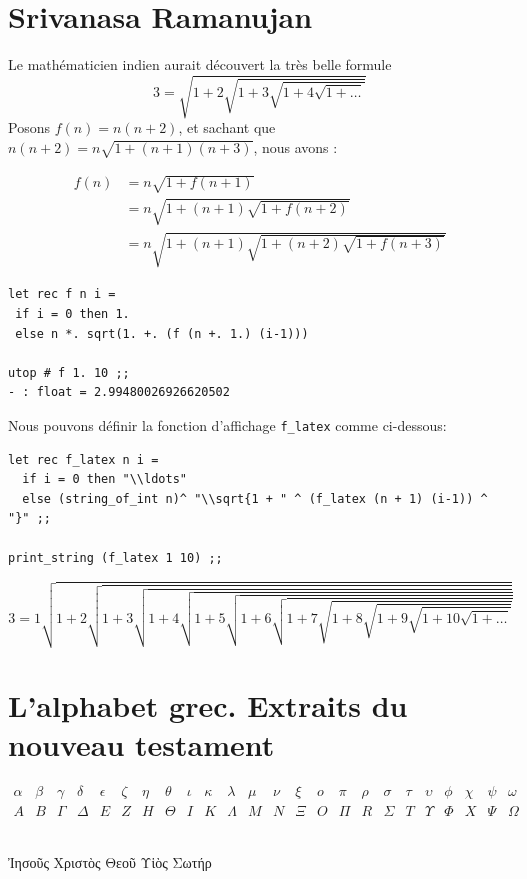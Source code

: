 \documentclass[11pt]{book}
\begin{document}

\section{Srivanasa Ramanujan}
Le mathématicien indien aurait  découvert la très belle formule 
$$ 3 = \sqrt{1+2\sqrt{1+3\sqrt{1+4\sqrt{1+\ldots}}}} $$
Posons $f(n) = n(n+2)$, et sachant que $n(n+2) = n \sqrt{1+(n+1)(n+3)}$, nous avons :

\begin{align*}
	f(n) &= n\sqrt{1+f(n+1)} \\
	 	 &= n\sqrt{1+(n+1)\sqrt{1+f(n+2)}} \\
	 	 &= n\sqrt{1+(n+1)\sqrt{1+(n+2)\sqrt{1+f(n+3)}}}
\end{align*}

\begin{Verbatim}
let rec f n i =
 if i = 0 then 1.
 else n *. sqrt(1. +. (f (n +. 1.) (i-1)))

utop # f 1. 10 ;;
- : float = 2.99480026926620502
\end{Verbatim}

Nous pouvons définir la fonction d'affichage \verb+f_latex+ comme ci-dessous:
\begin{Verbatim}
let rec f_latex n i =
  if i = 0 then "\\ldots"  
  else (string_of_int n)^ "\\sqrt{1 + " ^ (f_latex (n + 1) (i-1)) ^ "}" ;;

print_string (f_latex 1 10) ;;	
\end{Verbatim}
$$3 = 1\sqrt{1 + 2\sqrt{1 + 3\sqrt{1 + 4\sqrt{1 + 5\sqrt{1 + 6\sqrt{1 + 7\sqrt{1 + 8\sqrt{1 + 9\sqrt{1 + 10\sqrt{1 + \ldots}}}}}}}}}}
$$
\section{L'alphabet grec. Extraits du nouveau testament}
\[
\begin{array}{cccccccccccccccccccccccc}
 \alpha & \beta &\gamma &  \delta & \epsilon & \zeta & \eta &\theta & \iota &\kappa &\lambda & \mu & \nu & \xi & o & \pi & \rho & \sigma & \tau & 
 \upsilon & \phi & \chi & \psi & \omega \\
 A & B & \Gamma & \Delta & E & Z & H & \Theta & I & K & \Lambda & M & N  &\Xi & O & \Pi & R & \Sigma & T & \Upsilon & \Phi & X & \Psi & \Omega
 \end{array}
 \]

 \begin{center}
\\
\textgreek{Ἰησοῦς  Χριστὸς Θεοῦ Υἱὸς Σωτήρ} 
\end{center}
\end{document}
